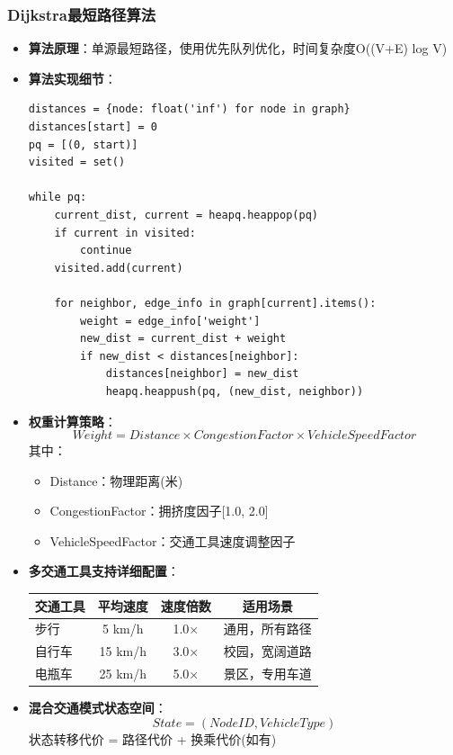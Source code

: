\documentclass[12pt,a4paper]{article}
\begin{document}
\subsubsection{Dijkstra最短路径算法}
\begin{itemize}
    \item \textbf{算法原理}：单源最短路径，使用优先队列优化，时间复杂度O((V+E) log V)
    \item \textbf{算法实现细节}：
    \begin{verbatim}
distances = {node: float('inf') for node in graph}
distances[start] = 0
pq = [(0, start)]
visited = set()

while pq:
    current_dist, current = heapq.heappop(pq)
    if current in visited:
        continue
    visited.add(current)
    
    for neighbor, edge_info in graph[current].items():
        weight = edge_info['weight']
        new_dist = current_dist + weight
        if new_dist < distances[neighbor]:
            distances[neighbor] = new_dist
            heapq.heappush(pq, (new_dist, neighbor))
    \end{verbatim}
    \item \textbf{权重计算策略}：
    \[Weight = Distance \times CongestionFactor \times VehicleSpeedFactor\]
    其中：
    \begin{itemize}
        \item Distance：物理距离(米)
        \item CongestionFactor：拥挤度因子[1.0, 2.0]
        \item VehicleSpeedFactor：交通工具速度调整因子
    \end{itemize}
    \item \textbf{多交通工具支持详细配置}：
    \begin{center}
    \begin{tabular}{|l|c|c|c|}
    \hline
    \textbf{交通工具} & \textbf{平均速度} & \textbf{速度倍数} & \textbf{适用场景} \\
    \hline
    步行 & 5 km/h & 1.0× & 通用，所有路径 \\
    自行车 & 15 km/h & 3.0× & 校园，宽阔道路 \\
    电瓶车 & 25 km/h & 5.0× & 景区，专用车道 \\
    \hline
    \end{tabular}
    \end{center}
    \item \textbf{混合交通模式状态空间}：
    \[State = (NodeID, VehicleType)\]
    状态转移代价 = 路径代价 + 换乘代价(如有)

\end{itemize}
\end{document}
